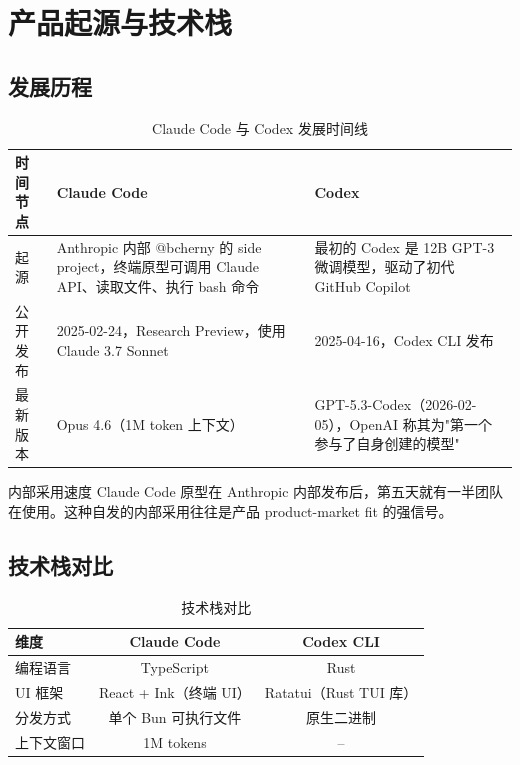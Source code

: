 \section{产品起源与技术栈}

\subsection{发展历程}

\begin{table}[H]
\centering
\caption{Claude Code 与 Codex 发展时间线}
\begin{tabular}{lp{5.5cm}p{5.5cm}}
\toprule
\textbf{时间节点} & \textbf{Claude Code} & \textbf{Codex} \\
\midrule
起源 & Anthropic 内部 @bcherny 的 side project，终端原型可调用 Claude API、读取文件、执行 bash 命令 & 最初的 Codex 是 12B GPT-3 微调模型，驱动了初代 GitHub Copilot \\
\addlinespace
公开发布 & 2025-02-24，Research Preview，使用 Claude 3.7 Sonnet & 2025-04-16，Codex CLI 发布 \\
\addlinespace
最新版本 & Opus 4.6（1M token 上下文） & GPT-5.3-Codex（2026-02-05），OpenAI 称其为"第一个参与了自身创建的模型" \\
\bottomrule
\end{tabular}
\end{table}

\begin{knowledgebox}{内部采用速度}
Claude Code 原型在 Anthropic 内部发布后，第五天就有一半团队在使用。这种自发的内部采用往往是产品 product-market fit 的强信号。
\end{knowledgebox}

\subsection{技术栈对比}

\begin{table}[H]
\centering
\caption{技术栈对比}
\begin{tabular}{lcc}
\toprule
\textbf{维度} & \textbf{Claude Code} & \textbf{Codex CLI} \\
\midrule
编程语言 & TypeScript & Rust \\
UI 框架 & React + Ink（终端 UI） & Ratatui（Rust TUI 库） \\
分发方式 & 单个 Bun 可执行文件 & 原生二进制 \\
上下文窗口 & 1M tokens & -- \\
\bottomrule
\end{tabular}
\end{table}


